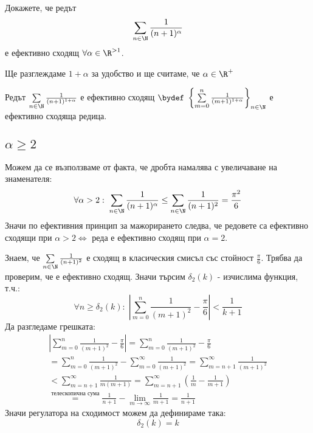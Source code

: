 \begin{problem}
     Докажете, че редът 
     \begin{equation}
         \sum\limits_{n\in\N} \frac{1}{(n+1)^\alpha}
     \end{equation}
     е ефективно сходящ $\forall \alpha \in \R^{> 1}$.
\end{problem}
\begin{solution}
    Ще разглеждаме $1 + \alpha$ за удобство и ще считаме, че $\alpha \in \R^+$

    Редът $\sum\limits_{n\in\N} \frac{1}{(n+1)^{1 + \alpha}}$ е ефективно сходящ $\bydef$ $\left\{\sum\limits_{m=0}^n \frac{1}{(m+1)^{1 + \alpha}} \right\}_{n\in\N}$ е ефективно сходяща редица.

    \subsection*{$\alpha \geq 2$}
    Можем да се възползваме от факта, че дробта намалява с увеличаване на знаменателя:
    \begin{equation}
        \forall \alpha > 2:\; \sum\limits_{n\in\N} \frac{1}{(n+1)^\alpha} \leq \sum\limits_{n\in\N} \frac{1}{(n+1)^2} = \frac{\pi^2}{6}
    \end{equation}
    Значи по ефективния принцип за мажорирането следва, че редовете са ефективно сходящи при $\alpha > 2 \iff$ реда е ефективно сходящ при $\alpha = 2$.

    Знаем, че $\sum\limits_{n\in\N} \frac{1}{(n+1)^2}$ е сходящ в класическия смисъл със стойност $\frac{\pi}{6}$. Трябва да проверим, че е ефективно сходящ. Значи търсим $\delta_2(k)$ - изчислима функция, т.ч.:
    \begin{equation}
        \forall n \geq \delta_2(k):\; \left|\sum\limits_{m=0}^n \frac{1}{(m+1)^2} - \frac{\pi}{6}\right| < \frac{1}{k+1}
    \end{equation}
    Да разгледаме грешката:
    \begin{equation}
        \begin{split}
            \left|\sum\limits_{m=0}^n \frac{1}{(m+1)^2} - \frac{\pi}{6}\right| = \sum\limits_{m=0}^n \frac{1}{(m+1)^2} - \frac{\pi}{6}\\
            = \sum\limits_{m=0}^n \frac{1}{(m+1)^2} -  \sum\limits_{m=0}^\infty \frac{1}{(m+1)^2} =  \sum\limits_{m=n+1}^\infty \frac{1}{(m+1)^2} \\
            < \sum\limits_{m=n+1}^\infty \frac{1}{m(m+1)} = \sum\limits_{m=n+1}^\infty \left( \frac{1}{m} - \frac{1}{m+1} \right) \\
            \overset{\text{телескопична сума}}{=} \frac{1}{n+1} - \lim\limits_{m\to\infty} \frac{1}{m+1} = \frac{1}{n+1}
        \end{split}
    \end{equation}
    Значи регулатора на сходимост можем да дефинираме така:
    \begin{equation}
        \delta_2(k) = k
    \end{equation}


\end{solution}
